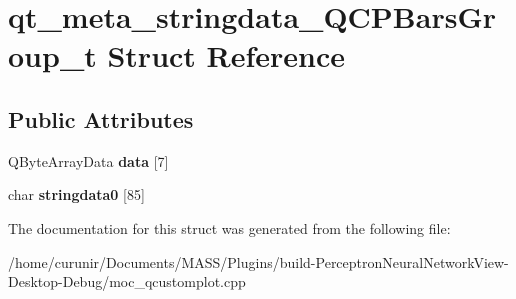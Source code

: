 \hypertarget{structqt__meta__stringdata___q_c_p_bars_group__t}{}\section{qt\+\_\+meta\+\_\+stringdata\+\_\+\+Q\+C\+P\+Bars\+Group\+\_\+t Struct Reference}
\label{structqt__meta__stringdata___q_c_p_bars_group__t}
\subsection*{Public Attributes}
\begin{DoxyCompactItemize}
\item 
Q\+Byte\+Array\+Data {\bfseries data} \mbox{[}7\mbox{]}\hypertarget{structqt__meta__stringdata___q_c_p_bars_group__t_a4af132fa7aa52aa1a2e32fed4547ee11}{}\label{structqt__meta__stringdata___q_c_p_bars_group__t_a4af132fa7aa52aa1a2e32fed4547ee11}

\item 
char {\bfseries stringdata0} \mbox{[}85\mbox{]}\hypertarget{structqt__meta__stringdata___q_c_p_bars_group__t_a2dd46435dea832cba9d6432a1b729650}{}\label{structqt__meta__stringdata___q_c_p_bars_group__t_a2dd46435dea832cba9d6432a1b729650}

\end{DoxyCompactItemize}


The documentation for this struct was generated from the following file\+:\begin{DoxyCompactItemize}
\item 
/home/curunir/\+Documents/\+M\+A\+S\+S/\+Plugins/build-\/\+Perceptron\+Neural\+Network\+View-\/\+Desktop-\/\+Debug/moc\+\_\+qcustomplot.\+cpp\end{DoxyCompactItemize}
